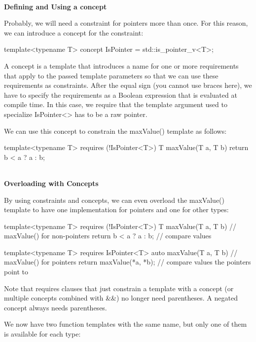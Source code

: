 \noindent
\hspace*{\fill} \\ %
\textbf{Defining and Using a concept}

Probably, we will need a constraint for pointers more than once. For this reason, we can introduce a concept for the constraint:

\begin{cpp}
template<typename T>
concept IsPointer = std::is_pointer_v<T>;
\end{cpp}

A concept is a template that introduces a name for one or more requirements that apply to the passed template parameters so that we can use these requirements as constraints. After the equal sign (you cannot use braces here), we have to specify the requirements as a Boolean expression that is evaluated at compile time. In this case, we require that the template argument used to specialize IsPointer<> has to be a raw pointer.

We can use this concept to constrain the maxValue() template as follows:

\begin{cpp}
template<typename T>
requires (!IsPointer<T>)
T maxValue(T a, T b)
{
	return b < a ? a : b;
}
\end{cpp}

\noindent
\hspace*{\fill} \\ %
\textbf{Overloading with Concepts}

By using constraints and concepts, we can even overload the maxValue() template to have one implementation for pointers and one for other types:

\begin{cpp}
template<typename T>
requires (!IsPointer<T>)
T maxValue(T a, T b) // maxValue() for non-pointers
{
	return b < a ? a : b; // compare values
}

template<typename T>
requires IsPointer<T>
auto maxValue(T a, T b) // maxValue() for pointers
{
	return maxValue(*a, *b); // compare values the pointers point to
}
\end{cpp}

Note that requires clauses that just constrain a template with a concept (or multiple concepts combined with \&\&) no longer need parentheses. A negated concept always needs parentheses.

We now have two function templates with the same name, but only one of them is available for each type:

